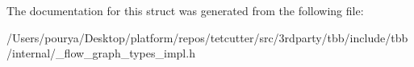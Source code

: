 The documentation for this struct was generated from the following file\+:\begin{DoxyCompactItemize}
\item 
/\+Users/pourya/\+Desktop/platform/repos/tetcutter/src/3rdparty/tbb/include/tbb/internal/\+\_\+flow\+\_\+graph\+\_\+types\+\_\+impl.\+h\end{DoxyCompactItemize}
